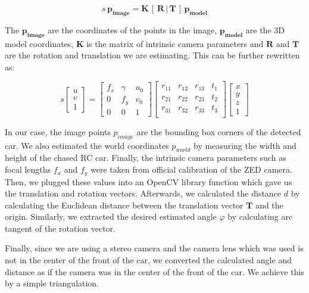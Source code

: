 \begin{equation}
s\,\mathbf{p_{image}} = \mathbf{K}\,[\,\mathbf{R}\, |\, \mathbf{T}\, ]\, \mathbf{p_{model}}
\end{equation}

The $\mathbf{p_{image}}$ are the coordinates of the points in the image, $\mathbf{p_{model}}$ are the 3D model coordinates, $\mathbf{K}$ is the matrix of intrinsic camera parameters and $\mathbf{R}$ and $\mathbf{T}$ are the rotation and translation we are estimating. This can be further rewritten as: \par


\begin{equation}
s\begin{bmatrix}u\\v\\1\end{bmatrix} = \begin{bmatrix}
f_x & \gamma & u_0\\
0 & f_y & v_0\\
0 & 0 & 1
\end{bmatrix}\begin{bmatrix}
r_{11} & r_{12} & r_{13} & t_{1}\\
r_{21} & r_{22} & r_{23} & t_{2}\\
r_{31} & r_{32} & r_{33} & t_{3}\\
\end{bmatrix}
\begin{bmatrix}x\\y\\z\\1\end{bmatrix}
\end{equation}

In our case, the image points $p_{image}$ are the bounding box corners of the detected car. We also estimated the world coordinates $p_{world}$ by measuring the width and height of the chased RC car. Finally, the intrinsic camera parameters such as focal lengths $f_x$ and $f_y$ were taken from official calibration of the ZED camera. Then, we plugged these values into an OpenCV \cite{opencv_library} library function which gave us the translation and rotation vectors. Afterwards, we calculated the distance $d$ by calculating the Euclidean distance between the translation vector $\mathbf{T}$ and the origin. Similarly, we extracted the desired estimated angle $\varphi$ by calculating arc tangent of the rotation vector. 

Finally, since we are using a stereo camera and the camera lens which was used is not in the center of the front of the car, we converted the calculated angle and distance as if the camera was in the center of the front of the car. We achieve this by a simple triangulation.


